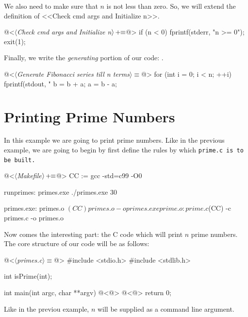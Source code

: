We also need to make sure that $n$ is not less than zero. So, we will extend the definition of <<Check cmd
args and Initialize n>>.

\begin{oldcode}
@<$\langle$\textit{Check cmd args and Initialize n}$\rangle \thinspace +\!\!\equiv$@>
if (n < 0) {
    fprintf(stderr, "n >= 0\n");
    exit(1);
}
\end{oldcode}

Finally, we write the \textit{generating} portion of our code: .

\begin{code}
@<$\langle$\textit{Generate Fibonacci series till n terms}$\rangle\equiv$@>
for (int i = 0; i < n; ++i) {
    fprintf(stdout, "%
    b = b + a;
    a = b - a;
}
\end{code}
\section{Printing Prime Numbers}

In this example we are going to print prime numbers. Like in the previous example, we are going to begin by
first define the rules by which \tt prime.c \rm is to be built.

\begin{oldcode}
@<$\langle$\textit{Makefile}$\rangle \thinspace +\!\!\equiv$@>
CC := gcc -std=c99 -O0

runprimes: primes.exe
    ./primes.exe 30

primes.exe: primes.o
    $(CC) primes.o -o primes.exe

prime.o: prime.c
    $(CC) -c primes.c -o primes.o
\end{oldcode}

Now comes the interesting part: the C code which will print $n$ prime numbers. The core structure of our code
will be as follows:

\begin{code}[primes.c]
@<$\langle$\textit{primes.c}$\rangle\equiv$@>
#include <stdio.h>
#include <stdlib.h>

int isPrime(int);

int main(int argc, char **argv)
{
    @<@>
    @<@>
    return 0;
}
\end{code}


Like in the previou example, $n$ will be supplied as a command line argument.

